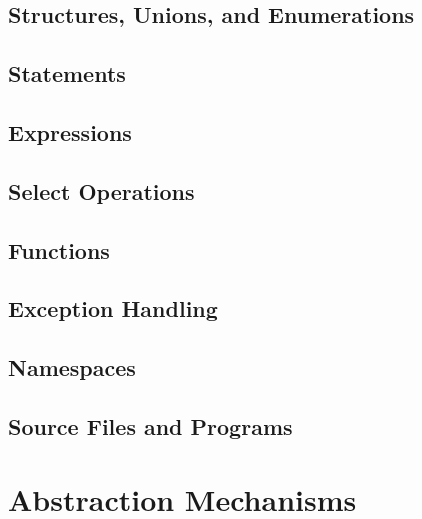 \documentclass[12pt,letterpaper]{book}
\theoremstyle{definition}
\theoremstyle{remark}
\begin{document}

\chapter{Structures, Unions, and Enumerations}


\chapter{Statements}


\chapter{Expressions}


\chapter{Select Operations}


\chapter{Functions}


\chapter{Exception Handling}


\chapter{Namespaces}


\chapter{Source Files and Programs}


\part{Abstraction Mechanisms}
\end{document}
